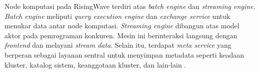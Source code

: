 Node komputasi pada RisingWave terdiri atas \textit{batch engine} dan \textit{streaming engine}. \textit{Batch engine} meliputi \textit{query execution engine} dan \textit{exchange service} untuk menukar data antar node komputasi. \textit{Streaming engine} dibangun atas model aktor pada pemrograman konkuren. Mesin ini berinteraksi langsung dengan \textit{frontend} dan melayani \textit{stream data}. Selain itu, terdapat \textit{meta service} yang berperan sebagai layanan sentral untuk menyimpan metadata seperti keadaan kluster, katalog sistem, keanggotaan kluster, dan lain-lain \parencite{risingwave}.